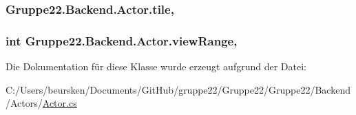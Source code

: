 \hypertarget{class_gruppe22_1_1_backend_1_1_actor_aa7ad76c503eeb79619e23151a18b1ffe}{
\subsubsection[{tile}]{ Gruppe22.\-Backend.\-Actor.\-tile\hspace{0.3cm}{\ttfamily [get]}, {\ttfamily [set]}}}\label{class_gruppe22_1_1_backend_1_1_actor_aa7ad76c503eeb79619e23151a18b1ffe}
\hypertarget{class_gruppe22_1_1_backend_1_1_actor_a7dc16682680a355fb8ba501de5c97f86}{
\subsubsection[{view\-Range}]{\setlength{\rightskip}{0pt plus 5cm}int Gruppe22.\-Backend.\-Actor.\-view\-Range\hspace{0.3cm}{\ttfamily [get]}, {\ttfamily [set]}}}\label{class_gruppe22_1_1_backend_1_1_actor_a7dc16682680a355fb8ba501de5c97f86}


Die Dokumentation für diese Klasse wurde erzeugt aufgrund der Datei\-:\begin{DoxyCompactItemize}
\item 
C\-:/\-Users/beursken/\-Documents/\-Git\-Hub/gruppe22/\-Gruppe22/\-Gruppe22/\-Backend/\-Actors/\hyperlink{_actor_8cs}{Actor.\-cs}\end{DoxyCompactItemize}

